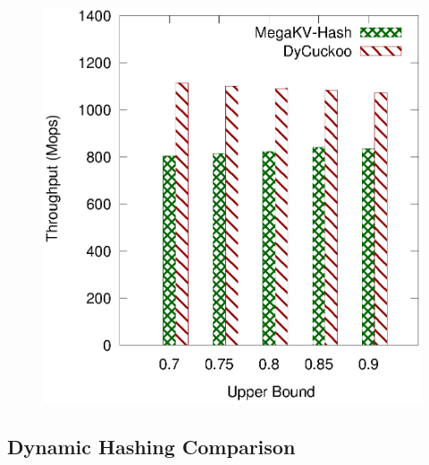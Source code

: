 \begin{figure}[htp]
\begin{minipage}{0.19\linewidth}
		\centerline{\dsali}
	\end{minipage}
	\begin{minipage}{0.19\linewidth}\centering
		\includegraphics[width=\linewidth]{pic/dynamic/upper/dynamic_random.eps}
		\centerline{\dsrandom}
	\end{minipage}
	\caption{}
	\label{fig:vary-upper-time}
\end{figure}

\subsection{Dynamic Hashing Comparison}\label{sec:exp:dynamic}

